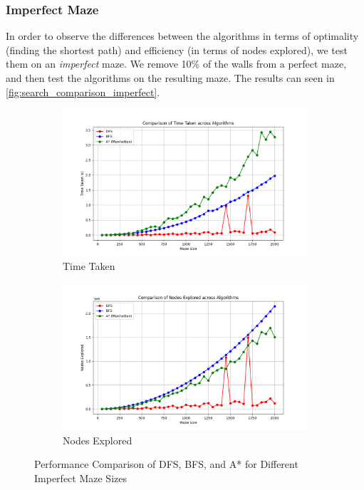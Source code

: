 \documentclass{article}
\begin{document}
\subsubsection{Imperfect Maze}

In order to observe the differences between the algorithms in terms of optimality (finding the shortest path) and efficiency (in terms of nodes explored), we test them on an \textit{imperfect} maze. We remove 10\% of the walls from a perfect maze, and then test the algorithms on the resulting maze. The results can seen in \autoref{fig:search_comparison_imperfect}.

\begin{figure}[h]
    \centering
    \begin{subfigure}[b]{0.49\textwidth}
        \centering
        \includegraphics[width=\textwidth]{Time Taken imperfect.png}
        \caption{Time Taken}
        \label{fig:time_taken_imperfect_search}
    \end{subfigure}
    \begin{subfigure}[b]{0.49\textwidth}
        \centering
        \includegraphics[width=\textwidth]{Nodes Explored imperfect.png}
        \caption{Nodes Explored}
        \label{fig:nodes_explored_imperfect_search}
    \end{subfigure}
    \caption{Performance Comparison of DFS, BFS, and A* for Different Imperfect Maze Sizes}
    \label{fig:search_comparison_imperfect}
\end{figure}
\end{document}
